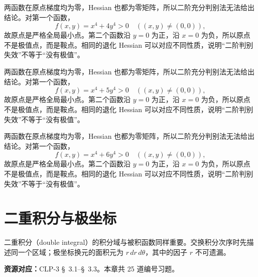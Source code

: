 \documentclass[12pt,fontset=fandol]{ctexart}
\begin{document}
\begin{solve}\label{ans:c35q22}
两函数在原点梯度均为零，Hessian 也都为零矩阵，所以二阶充分判别法无法给出结论。对第一个函数，
\[
f(x,y)=x^4+4y^4>0\quad((x,y)\ne(0,0)),
\]
故原点是严格全局最小点。第二个函数沿 $y=0$ 为正，沿 $x=0$ 为负，所以原点不是极值点，而是鞍点。相同的退化 Hessian 可以对应不同性质，说明“二阶判别失效”不等于“没有极值”。
\end{solve}

\begin{solve}\label{ans:c35q23}
两函数在原点梯度均为零，Hessian 也都为零矩阵，所以二阶充分判别法无法给出结论。对第一个函数，
\[
f(x,y)=x^4+5y^4>0\quad((x,y)\ne(0,0)),
\]
故原点是严格全局最小点。第二个函数沿 $y=0$ 为正，沿 $x=0$ 为负，所以原点不是极值点，而是鞍点。相同的退化 Hessian 可以对应不同性质，说明“二阶判别失效”不等于“没有极值”。
\end{solve}

\begin{solve}\label{ans:c35q24}
两函数在原点梯度均为零，Hessian 也都为零矩阵，所以二阶充分判别法无法给出结论。对第一个函数，
\[
f(x,y)=x^4+6y^4>0\quad((x,y)\ne(0,0)),
\]
故原点是严格全局最小点。第二个函数沿 $y=0$ 为正，沿 $x=0$ 为负，所以原点不是极值点，而是鞍点。相同的退化 Hessian 可以对应不同性质，说明“二阶判别失效”不等于“没有极值”。
\end{solve}

\clearpage
\section{二重积分与极坐标}\label{sec:ch36}
二重积分（double integral）的积分域与被积函数同样重要。交换积分次序时先描述同一个区域；极坐标换元的面积元为 $r\,dr\,d\theta$，其中的因子 $r$ 不可遗漏。

\textbf{资源对应：}CLP-3 \S~3.1--\S~3.3。本章共 25 道编号习题。
\end{document}
